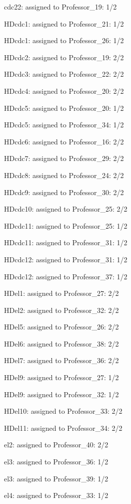 \documentclass{article} %
\begin{document}
\noindent cdc22: assigned to Professor\_19: 1/2

\noindent HDcdc1: assigned to Professor\_21: 1/2

\noindent HDcdc1: assigned to Professor\_26: 1/2

\noindent HDcdc2: assigned to Professor\_19: 2/2

\noindent HDcdc3: assigned to Professor\_22: 2/2

\noindent HDcdc4: assigned to Professor\_20: 2/2

\noindent HDcdc5: assigned to Professor\_20: 1/2

\noindent HDcdc5: assigned to Professor\_34: 1/2

\noindent HDcdc6: assigned to Professor\_16: 2/2

\noindent HDcdc7: assigned to Professor\_29: 2/2

\noindent HDcdc8: assigned to Professor\_24: 2/2

\noindent HDcdc9: assigned to Professor\_30: 2/2

\noindent HDcdc10: assigned to Professor\_25: 2/2

\noindent HDcdc11: assigned to Professor\_25: 1/2

\noindent HDcdc11: assigned to Professor\_31: 1/2

\noindent HDcdc12: assigned to Professor\_31: 1/2

\noindent HDcdc12: assigned to Professor\_37: 1/2

\noindent HDel1: assigned to Professor\_27: 2/2

\noindent HDel2: assigned to Professor\_32: 2/2

\noindent HDel5: assigned to Professor\_26: 2/2

\noindent HDel6: assigned to Professor\_38: 2/2

\noindent HDel7: assigned to Professor\_36: 2/2

\noindent HDel9: assigned to Professor\_27: 1/2

\noindent HDel9: assigned to Professor\_32: 1/2

\noindent HDel10: assigned to Professor\_33: 2/2

\noindent HDel11: assigned to Professor\_34: 2/2

\noindent el2: assigned to Professor\_40: 2/2

\noindent el3: assigned to Professor\_36: 1/2

\noindent el3: assigned to Professor\_39: 1/2

\noindent el4: assigned to Professor\_33: 1/2
\end{document}
